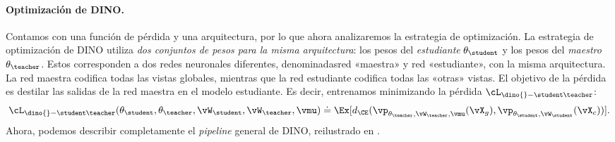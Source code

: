 \documentclass[../../book-main_es.tex]{subfiles}
\begin{document}
\paragraph{Optimización de DINO.} Contamos con una función de pérdida y una
arquitectura, por lo que ahora analizaremos la estrategia de optimización. La
estrategia de optimización de DINO utiliza \textit{dos conjuntos de pesos para
la misma arquitectura}: los pesos del \textit{estudiante}
\(\theta_{\student}\) y los pesos del \textit{maestro}
\(\theta_{\teacher}\). Estos corresponden a dos redes neuronales
diferentes, denominadasred «maestra» y red «estudiante», con la
misma arquitectura. La red maestra codifica todas las vistas globales,
mientras que la red estudiante codifica todas las «otras» vistas. El objetivo de
la pérdida es destilar las salidas de la red maestra en el modelo estudiante.
Es decir, entrenamos minimizando la pérdida \(\cL_{\dino{}-\student\teacher}\):
\begin{equation}\label{eq:dino_loss_teacherstudent}
    \cL_{\dino{}-\student\teacher}(\theta_{\student},
    \theta_{\teacher}, \vW_{\student}, \vW_{\teacher}, \vmu) \doteq
    \Ex[d_{\CE}(\vp_{\theta_{\teacher}, \vW_{\teacher},
    \vmu}(\vX_{g}), \vp_{\theta_{\student}, \vW_{\student}}(\vX_{c}))].
\end{equation}
Ahora, podemos describir completamente el \textit{pipeline} general de DINO, reilustrado en
.
\end{document}
